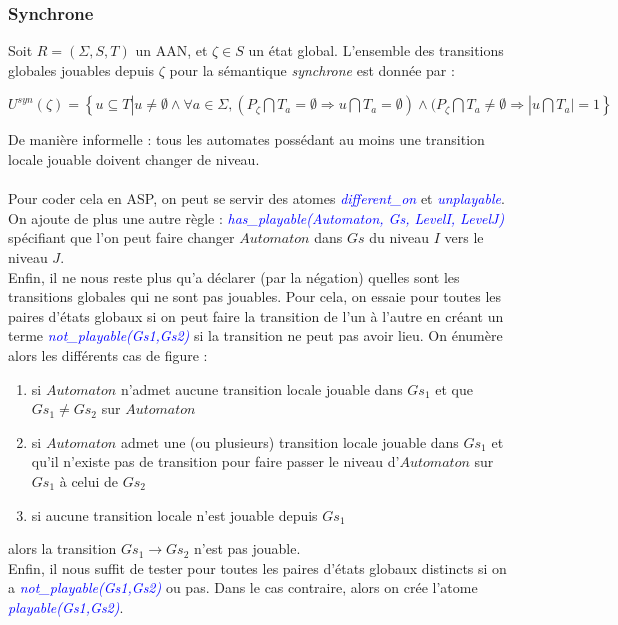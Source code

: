 \documentclass[12pt,a4paper]{article}
\begin{document}
\subsubsection{Synchrone}
Soit $R = (\Sigma,S,T)$ un AAN, et $\zeta\in S$ un état global. L'ensemble des transitions globales jouables depuis $\zeta$ pour la sémantique \emph{synchrone} est donnée par :
\begin{center}
	$U^{syn}(\zeta)=\left\{u\subseteq T|u \neq \emptyset \wedge \forall a\in\Sigma,(P_{\zeta}\bigcap T_a = \emptyset \Rightarrow u\bigcap 
	T_a=\emptyset)\wedge(P_{\zeta}\bigcap T_a\neq\emptyset\Rightarrow |u\bigcap T_a |=1\right\}$
\end{center}
De manière informelle : tous les automates possédant au moins une transition locale jouable doivent changer de niveau.\\ \\
Pour coder cela en ASP, on peut se servir des atomes \emph{\textcolor{blue}{different\_on}} et \emph{\textcolor{blue}{unplayable}}.\\
On ajoute de plus une autre règle : \emph{\textcolor{blue}{has\_playable(Automaton, Gs, LevelI, LevelJ)}} spécifiant que l'on peut faire changer $Automaton$ dans $Gs$ du niveau $I$ vers le niveau $J$.\\
Enfin, il ne nous reste plus qu'a déclarer (par la négation) quelles sont les transitions globales qui ne sont pas jouables. Pour cela, on essaie pour toutes les paires d'états globaux si on peut faire la transition de l'un à 
l'autre en créant un terme \emph{\textcolor{blue}{not\_playable(Gs1,Gs2)}} si la transition ne peut pas avoir lieu. On énumère alors les différents cas de figure :
\begin{enumerate}
	\item si $Automaton$ n'admet aucune transition locale jouable dans $Gs_1$ et que $Gs_1\neq Gs_2$ sur $Automaton$
	\item si $Automaton$ admet une (ou plusieurs) transition locale jouable dans $Gs_1$ et qu'il n'existe pas de transition pour faire passer le niveau d'$Automaton$ sur $Gs_1$ à celui de $Gs_2$
	\item si aucune transition locale n'est jouable depuis $Gs_1$
\end{enumerate}
alors la transition $Gs_1\rightarrow Gs_2$ n'est pas jouable.\\
Enfin, il nous suffit de tester pour toutes les paires d'états globaux distincts si on a \emph{\textcolor{blue}{not\_playable(Gs1,Gs2)}} ou pas. Dans le cas contraire, alors on crée l'atome 
\emph{\textcolor{blue}{playable(Gs1,Gs2)}}.
\end{document}
